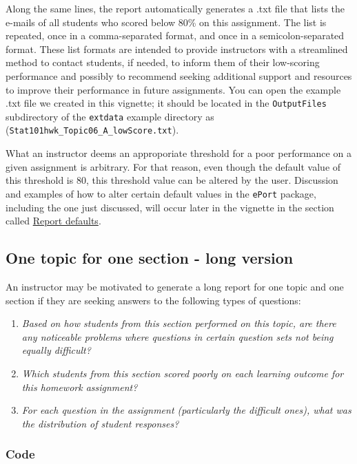 \documentclass{article}\usepackage[]{graphicx}\usepackage[]{color}
\numberwithin{equation}{section} %
\begin{document}
Along the same lines, the report automatically generates a .txt file that lists the e-mails of all students who scored below 80\% on this assignment. The list is repeated, once in a comma-separated format, and once in a semicolon-separated format. These list formats are intended to provide instructors with a streamlined method to contact students, if needed, to inform them of their low-scoring performance and possibly to recommend seeking additional support and resources to improve their performance in future assignments. You can open the example .txt file we created in this vignette; it should be located in the \texttt{OutputFiles} subdirectory of the \texttt{extdata} example directory as (\texttt{Stat101hwk\_Topic06\_A\_lowScore.txt}).

What an instructor deems an approporiate threshold for a poor performance on a given assignment is arbitrary. For that reason, even though the default value of this threshold is 80, this threshold value can be altered by the user. Discussion and examples of how to alter certain default values in the \texttt{ePort} package, including the one just discussed, will occur later in the vignette in the section called \hyperref[sec:repOptions]{Report defaults}.

\subsection{One topic for one section - long version}

An instructor may be motivated to generate a long report for one topic and one section if they are seeking answers to the following types of questions:

\begin{enumerate}
\item \textit{Based on how students from this section performed on this topic, are there any noticeable problems where questions in certain question sets not being equally difficult?}
\item \textit{Which students from this section scored poorly on each learning outcome for this homework assignment?}
\item \textit{For each question in the assignment (particularly the difficult ones), what was the distribution of student responses?}
\end{enumerate}

\subsubsection{Code}
\end{document}
